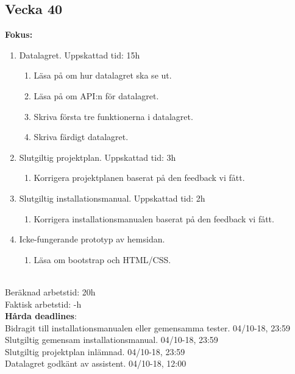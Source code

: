 \documentclass{TDP003mall}
\begin{document}
\subsection{Vecka 40}
\textbf{Fokus:}
\begin{enumerate}
    \item Datalagret. Uppskattad tid: 15h
    \begin{enumerate}
        \item Läsa på om hur datalagret ska se ut.
        \item Läsa på om API:n för datalagret.
        \item Skriva första tre funktionerna i datalagret.
        \item Skriva färdigt datalagret.
    \end{enumerate}
    \item Slutgiltig projektplan. Uppskattad tid: 3h
    \begin{enumerate}
        \item Korrigera projektplanen baserat på den feedback vi fått.
    \end{enumerate}
    \item Slutgiltig installationsmanual. Uppskattad tid: 2h
    \begin{enumerate}
        \item Korrigera installationsmanualen baserat på den feedback vi fått.
    \end{enumerate}
    \item Icke-fungerande prototyp av hemsidan.
    \begin{enumerate}
        \item Läsa om bootstrap och HTML/CSS.
    \end{enumerate}
\end{enumerate}
\\
Beräknad arbetstid: 20h\\
Faktisk arbetstid: -h\\

\textbf{Hårda deadlines}:\\
Bidragit till installationsmanualen eller gemensamma tester. 04/10-18, 23:59\\
Slutgiltig gemensam installationsmanual. 04/10-18, 23:59\\
Slutgiltig projektplan inlämnad. 04/10-18, 23:59\\
Datalagret godkänt av assistent. 04/10-18, 12:00\\\\
\end{document}
